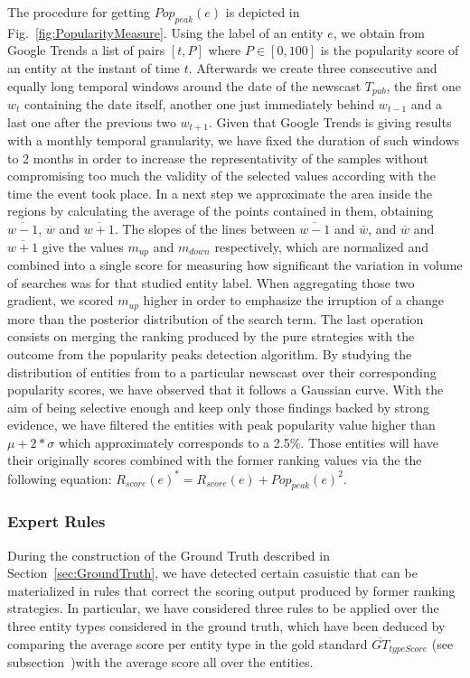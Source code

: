 \documentclass{llncs}
\begin{document}
The procedure for getting $Pop_{peak}(e)$ is depicted in Fig.~\ref{fig:PopularityMeasure}. Using the label of an entity $e$, we obtain from Google Trends a list of pairs $[t, P]$ where $P\in[0,100]$ is the popularity score of an entity at the instant of time $t$. Afterwards we create three consecutive and equally long temporal windows around the date of the newscast $T_{pub}$, the first one $w_{t}$ containing the date itself, another one just immediately behind $w_{t-1}$ and a last one after the previous two $w_{t+1}$. Given that Google Trends is giving results with a monthly temporal granularity, we have fixed the duration of such windows to 2 months in order to increase the representativity of the samples without compromising too much the validity of the selected values according with the time the event took place. 
In a next step we approximate the area inside the regions by calculating the average of the points contained in them, obtaining $\overline{w-1}$, $\overline{w}$ and $\overline{w+1}$. The slopes of the lines between $\overline{w-1}$ and $\overline{w}$, and $\overline{w}$ and $\overline{w+1}$ give the values $m_{up}$ and $m_{down}$ respectively, which are normalized and combined into a single score for measuring how significant the variation in volume of searches was for that studied entity label. When aggregating those two gradient, we scored $m_{up}$ higher in order to emphasize the irruption of a change more than the posterior distribution of the search term.
The last operation consists on merging the ranking produced by the pure strategies with the outcome from the popularity peaks detection algorithm. By studying the distribution of entities from to a particular newscast over their corresponding popularity scores, we have observed that it follows a Gaussian curve. With the aim of being selective enough and keep only those findings backed by strong evidence, we have filtered the entities with peak popularity value higher than $\mu+2*\sigma$ which approximately corresponds to a 2.5\%. Those entities will have their originally scores combined with the former ranking values via the the following equation: $R_{score}\left ( e \right )^{*} =  R_{score}\left ( e \right ) +Pop_{peak}(e)^{2} $.

\subsubsection{Expert Rules}
During the construction of the Ground Truth described in Section~\ref{sec:GroundTruth}, we have detected certain casuistic that can be materialized in rules that correct the scoring output produced by former ranking strategies. In particular, we have considered three rules to be applied over the three entity types considered in the ground truth, which have been deduced by comparing the average score per entity type in the gold standard $\overline{GT}_{typeScore}$ (see subsection~\label{sec:LessonsLearned})with the average score all over the entities.
\end{document}
